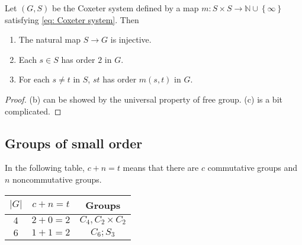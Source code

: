 \begin{theorem}
  Let \( (G, S) \) be the Coxeter system defined by a map \( m: S \times S \to \mathbb{N} \cup \left\lbrace \infty \right\rbrace \) satisfying \cref{eq: Coxeter system}.
  Then
  \begin{enumerate}
    \item The natural map \( S \to G \) is injective.
    \item Each \( s \in S \) has order \( 2 \) in \( G \).
    \item For each \( s \neq t \) in \( S \), \( st \) has order \( m(s, t) \) in \( G \).
  \end{enumerate}
\end{theorem}
\begin{proof}
  (b) can be showed by the universal property of free group.
  (c) is a bit complicated.
\end{proof}

\subsection{Groups of small order}

In the following table, \( c + n = t \) means that there are \( c \) commutative groups and \( n \) noncommutative groups.
\begin{table}[H]
  \centering
  \begin{tabular}{c|c|c}
    \hline
    \( \left\vert G \right\vert \) & \( c + n = t \) & Groups\\
    \hline
    \( 4 \) & \( 2 + 0 = 2 \) & \( C_4, C_2 \times C_2 \)\\
    \( 6 \) & \( 1 + 1 = 2 \) & \( C_6; S_3 \)\\
    \hline
  \end{tabular}
\end{table}
